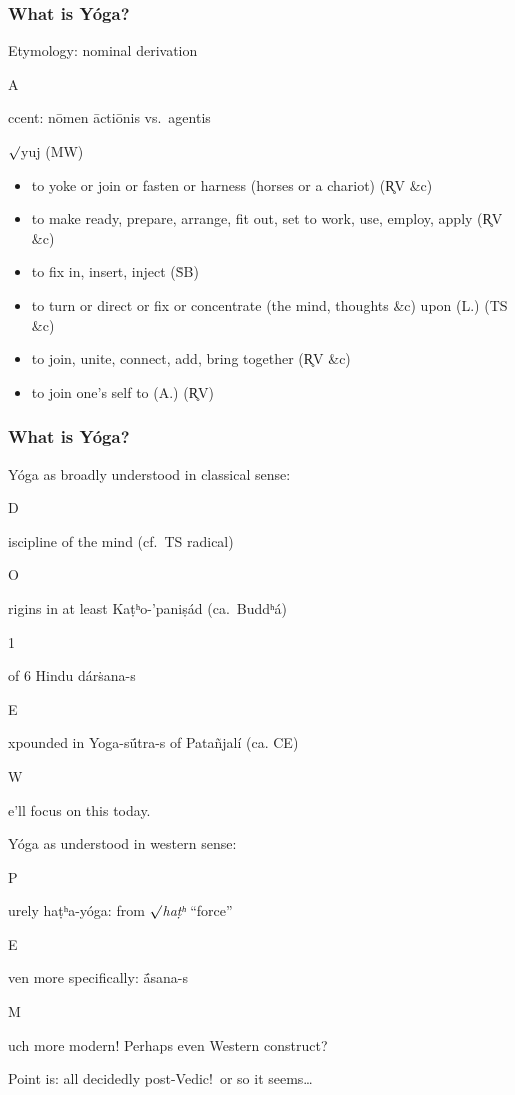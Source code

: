 \documentclass[pdf]{beamer}
\newcommand{\Subitem}[1]{{\setlength\itemindent{12pt} \item[-] #1}}
\newcommand{\Subsubitem}[1]{{\setlength\itemindent{24pt} \item[○] #1}}
\begin{document}
\begin{frame} \frametitle{What is Yóga?}
\begin{itemize}
	\item Etymology: nominal derivation
	\Subitem Accent: nōmen āctiōnis vs.~agentis
\end{itemize}

\begin{block} {$\surd$yuj (MW)}
\begin{itemize}
	\item to yoke or join or fasten or harness (horses or a chariot) (R̥V \&c)
	\item to make ready, prepare, arrange, fit out, set to work, use, employ, apply (R̥V \&c)
	\item to fix in, insert, inject (ṠB)
	\item to turn or direct or fix or concentrate (the mind, thoughts \&c) upon (L.) (TS \&c)
	\item to join, unite, connect, add, bring together (R̥V \&c)
	\item to join one's self to (A.) (R̥V)
\end{itemize}
\end{block}
\end{frame}

\begin{frame} \frametitle{What is Yóga?}
\begin{itemize}
	\item Yóga as broadly understood in classical sense:
	\Subitem Discipline of the mind (cf.~TS radical)
	\Subitem Origins in at least Kaṭʰo-'paniṣád (ca.~Buddʰá)
	\Subitem 1 of 6 Hindu dárṡana-s
	\Subitem Expounded in Yoga-sū́tra-s of Patañjalí (ca. CE)
	\Subitem We'll focus on this today.
	\pause \item Yóga as understood in western sense:
	\Subitem Purely haṭʰa-yóga: from $\surd$\textit{haṭʰ} ``force''
	\Subsubitem Even more specifically: ā́sana-s
	\Subitem Much more modern! Perhaps even Western construct?
	\pause \item Point is: all decidedly post-Vedic!~or so it seems\ldots
\end{itemize}
\end{frame}
\end{document}
